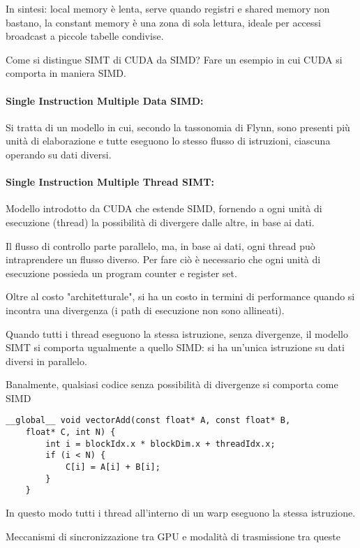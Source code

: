 \documentclass[12pt, answers]{exam}
\begin{document}
\begin{questions}
\begin{solution}
        In sintesi: local memory è lenta, serve quando registri e shared memory non bastano, la constant memory è una zona di sola lettura, ideale per accessi broadcast a piccole tabelle condivise.
    \end{solution}
    
    \question Come si distingue SIMT di CUDA da SIMD? Fare un esempio in cui CUDA si comporta in maniera SIMD.
    
    \begin{solution}
        \paragraph{Single Instruction Multiple Data SIMD:} Si tratta di un modello in cui, secondo la tassonomia di Flynn, sono presenti più unità di elaborazione e tutte eseguono lo stesso flusso di istruzioni, ciascuna operando su dati diversi.  
        
        \paragraph{Single Instruction Multiple Thread SIMT:} Modello introdotto da CUDA che estende SIMD, fornendo a ogni unità di esecuzione (thread) la possibilità di divergere dalle altre, in base ai dati. 
        
        Il flusso di controllo parte parallelo, ma, in base ai dati, ogni thread può intraprendere un flusso diverso. Per fare ciò è necessario che ogni unità di esecuzione possieda un program counter e register set. 
        
        Oltre al costo "architetturale", si ha un costo in termini di performance quando si incontra una divergenza (i path di esecuzione non sono allineati).
        
        Quando tutti i thread eseguono la stessa istruzione, senza divergenze, il modello SIMT si comporta ugualmente a quello SIMD: si ha un'unica istruzione su dati diversi in parallelo.
        
        Banalmente, qualsiasi codice senza possibilità di divergenze si comporta come SIMD
        \begin{verbatim}
__global__ void vectorAdd(const float* A, const float* B, 
    float* C, int N) {
        int i = blockIdx.x * blockDim.x + threadIdx.x;
        if (i < N) {
            C[i] = A[i] + B[i];
        }
    }
        \end{verbatim}
        In questo modo tutti i thread all'interno di un warp eseguono la stessa istruzione.
    \end{solution}
    
    \question Meccanismi di sincronizzazione tra GPU e modalità di trasmissione tra queste
    
    \begin{solution}
    \end{solution}
\end{questions}
\end{document}
